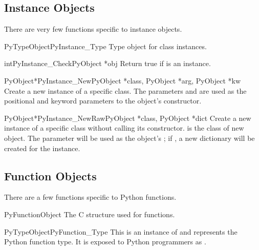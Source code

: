 \subsection{Instance Objects \label{instanceObjects}}

There are very few functions specific to instance objects.

\begin{cvardesc}{PyTypeObject}{PyInstance_Type}
  Type object for class instances.
\end{cvardesc}

\begin{cfuncdesc}{int}{PyInstance_Check}{PyObject *obj}
  Return true if  is an instance.
\end{cfuncdesc}

\begin{cfuncdesc}{PyObject*}{PyInstance_New}{PyObject *class,
                                             PyObject *arg,
                                             PyObject *kw}
  Create a new instance of a specific class.  The parameters 
  and  are used as the positional and keyword parameters to
  the object's constructor.
\end{cfuncdesc}

\begin{cfuncdesc}{PyObject*}{PyInstance_NewRaw}{PyObject *class,
                                                PyObject *dict}
  Create a new instance of a specific class without calling its
  constructor.   is the class of new object.  The
   parameter will be used as the object's ;
  if \NULL{}, a new dictionary will be created for the instance.
\end{cfuncdesc}


\subsection{Function Objects \label{function-objects}}

There are a few functions specific to Python functions.

\begin{ctypedesc}{PyFunctionObject}
  The C structure used for functions.
\end{ctypedesc}

\begin{cvardesc}{PyTypeObject}{PyFunction_Type}
  This is an instance of  and represents the
  Python function type.  It is exposed to Python programmers as
  .
\end{cvardesc}


